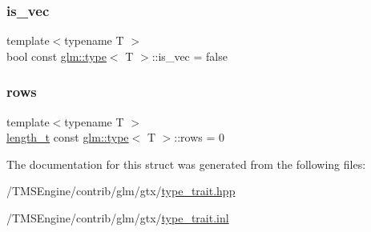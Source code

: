 \subsubsection{\texorpdfstring{is\+\_\+vec}{is\_vec}}
{\footnotesize\ttfamily template$<$typename T $>$ \\
bool const \hyperlink{structglm_1_1type}{glm\+::type}$<$ T $>$\+::is\+\_\+vec = false\hspace{0.3cm}{\ttfamily [static]}}

\mbox{\label{structglm_1_1type_ad04a64a448a28061ed81f90f0f52b691}} 
\subsubsection{\texorpdfstring{rows}{rows}}
{\footnotesize\ttfamily template$<$typename T $>$ \\
\hyperlink{namespaceglm_a090a0de2260835bee80e71a702492ed9}{length\+\_\+t} const \hyperlink{structglm_1_1type}{glm\+::type}$<$ T $>$\+::rows = 0\hspace{0.3cm}{\ttfamily [static]}}



The documentation for this struct was generated from the following files\+:\begin{DoxyCompactItemize}
\item 
/\+T\+M\+S\+Engine/contrib/glm/gtx/\hyperlink{type__trait_8hpp}{type\+\_\+trait.\+hpp}\item 
/\+T\+M\+S\+Engine/contrib/glm/gtx/\hyperlink{type__trait_8inl}{type\+\_\+trait.\+inl}\end{DoxyCompactItemize}
